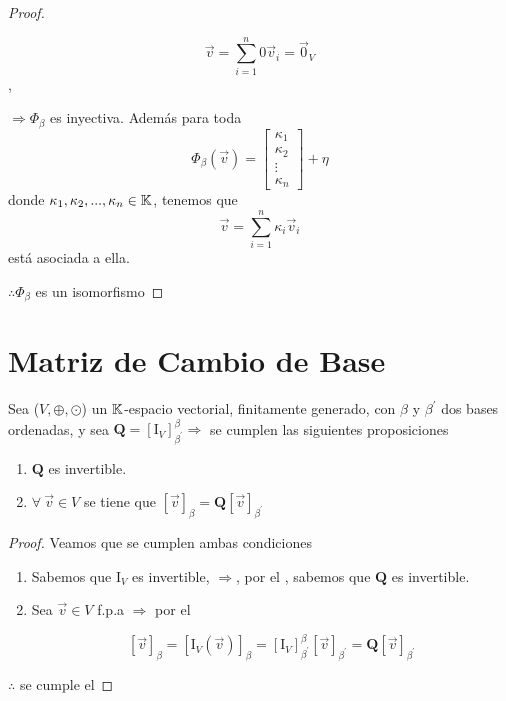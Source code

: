 \begin{proof}
\begin{enumerate}
    $$\vec{v}=\sum_{i=1}^n 0\vec{v}_i=\vec{0}_V$$, 
    
    $\Rightarrow \Phi_{\beta}$ es inyectiva. Además para toda $$\Phi_{\beta}(\vec{v})=\begin{bmatrix}
        \kappa_1 \\
        \kappa_2 \\
        \vdots \\
        \kappa_n
    \end{bmatrix}+\eta$$ donde $\kappa_1,\kappa_2,...,\kappa_n \in \mathbb{K}$, tenemos que 
    $$\vec{v}=\sum_{i=1}^n \kappa_i\vec{v}_i$$ 
    está asociada a ella. 
    \end{enumerate}
    $\therefore  \Phi_{\beta}$ es un isomorfismo
\end{proof}

\section{Matriz de Cambio de Base}

\begin{theorem} \label{theomatrizcb}
    Sea ($V, \oplus, \odot$) un $\mathbb{K}$-espacio vectorial, finitamente generado, con $\beta$ y ${\beta}^{\prime}$ dos bases ordenadas, y sea $\textbf{Q}=[\mathrm{I}_V]_{{\beta}^{\prime}}^{\beta} \Rightarrow$ se cumplen las siguientes proposiciones
    \begin{enumerate}
        \item $\textbf{Q}$ es invertible. 
        \item $\forall \: \vec{v} \in V$ se tiene que $[\vec{v}]_{\beta}=\textbf{Q}[\vec{v}]_{{\beta}^{\prime}}$
    \end{enumerate}
\end{theorem}

\begin{proof}
Veamos que se cumplen ambas condiciones
\begin{enumerate}
    \item Sabemos que $\mathrm{I}_V$ es invertible, $\Rightarrow$, por el , sabemos que $\textbf{Q}$ es invertible. 
    \item Sea $\vec{v} \in V$ f.p.a $\Rightarrow$ por el  
    
    $$[\vec{v}]_{\beta}=[\mathrm{I}_V(\vec{v})]_{\beta}=[\mathrm{I}_V]_{{\beta}^{\prime}}^{\beta}[\vec{v}]_{{\beta}^{\prime}}=\textbf{Q}[\vec{v}]_{{\beta}^{\prime}}$$ 
\end{enumerate}
    $\therefore$ se cumple el 
\end{proof}

